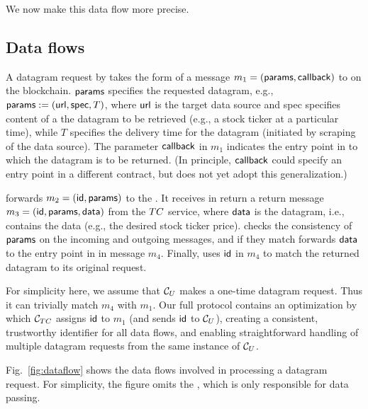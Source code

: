 \noindent We now make this data flow more precise. 

\subsection{Data flows}

A datagram request by \reqcont takes the form of a message $m_1 = ({\sf params}, {\sf callback})$ to \tcont on the blockchain. ${\sf params}$ specifies the requested datagram, e.g., ${\sf params} := ({{\sf url}}, {\sf spec}, T)$, where ${{\sf url}}$ is the target data source and {\sf spec} specifies content of a the datagram to be retrieved (e.g., a stock ticker at a particular time), while $T$ specifies the delivery time for the datagram (initiated by scraping of the data source). The parameter ${\sf callback}$ in $m_1$ indicates the entry point in \reqcont to which the datagram is to be returned. (In principle, ${\sf callback}$ could specify an entry point in a different contract, but \tc does not yet adopt this generalization.) 

\tcont forwards $m_2 = ({\sf id}, {\sf params})$ to the \encname. It receives in return a return message $m_3 = ({\sf id}, {\sf params}, {\sf data})$ from the $TC$ service, where ${\sf data}$ is the datagram, i.e., contains the data (e.g., the desired stock ticker price). \tcont checks the consistency of ${\sf params}$ on the incoming and outgoing messages, and if they match forwards ${\sf data}$ to the entry point \dgcallback in \reqcont in message $m_4$. Finally, \reqcont uses ${\sf id}$ in $m_4$ to match the returned datagram to its original request.

For simplicity here, we assume that ${\cal C}_U$ makes a one-time datagram request. Thus it can trivially match $m_4$ with $m_1$. Our full protocol contains an optimization by which ${\cal C}_{TC}$ assigns ${\sf id}$ to $m_1$ (and sends ${\sf id}$ to ${\cal C}_U$), creating a consistent, trustworthy identifier for all data flows, and enabling straightforward handling of multiple datagram requests from the same instance of ${\cal C}_U$.

Fig.~\ref{fig:dataflow} shows the data flows involved in processing a datagram request. For simplicity, the figure omits the \medname, which is only responsible for data passing.


